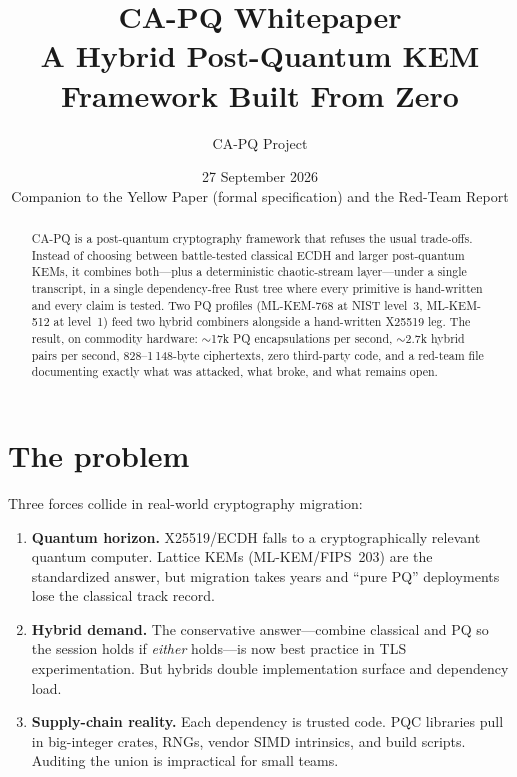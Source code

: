 \documentclass[11pt,a4paper]{article}
\title{\textbf{CA-PQ Whitepaper}\\\large A Hybrid Post-Quantum KEM Framework Built From Zero}
\author{CA-PQ Project}
\date{27 September 2026 \\ \small Companion to the Yellow Paper (formal specification) and the Red-Team Report}
\begin{document}
\maketitle
\thispagestyle{fancy}

\begin{abstract}
CA-PQ is a post-quantum cryptography framework that refuses the usual trade-offs.
Instead of choosing between battle-tested classical ECDH and larger post-quantum KEMs,
it combines both---plus a deterministic chaotic-stream layer---under a single transcript,
in a single dependency-free Rust tree where every primitive is hand-written and every
claim is tested. Two PQ profiles (ML-KEM-768 at NIST level~3, ML-KEM-512 at level~1)
feed two hybrid combiners alongside a hand-written X25519 leg. The result, on commodity
hardware: $\sim$17k PQ encapsulations per second, $\sim$2.7k hybrid pairs per second,
828--1\,148-byte ciphertexts, zero third-party code, and a red-team file documenting
exactly what was attacked, what broke, and what remains open.
\end{abstract}

\tableofcontents
\newpage

\section{The problem}

Three forces collide in real-world cryptography migration:

\begin{enumerate}[leftmargin=2em]
\item \textbf{Quantum horizon.} X25519/ECDH falls to a cryptographically relevant quantum
computer. Lattice KEMs (ML-KEM/FIPS~203) are the standardized answer, but migration takes
years and ``pure PQ'' deployments lose the classical track record.
\item \textbf{Hybrid demand.} The conservative answer---combine classical and PQ so the
session holds if \emph{either} holds---is now best practice in TLS experimentation. But
hybrids double implementation surface and dependency load.
\item \textbf{Supply-chain reality.} Each dependency is trusted code. PQC libraries pull in
big-integer crates, RNGs, vendor SIMD intrinsics, and build scripts. Auditing the union is
impractical for small teams.
\end{enumerate}
\end{document}
